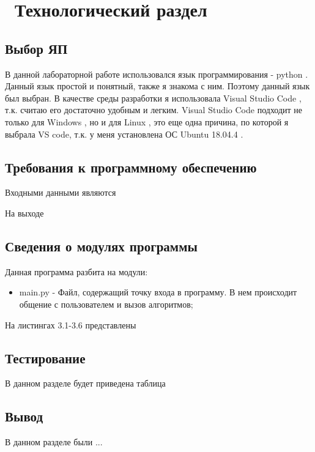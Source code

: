 \chapter{ Технологический раздел}
\label{cha:design}

\section{Выбор ЯП}

В данной лабораторной работе использовался язык программирования - python \cite{bib1}.
Данный язык простой и понятный, также я знакома с ним.
Поэтому данный язык был выбран. 
В качестве среды разработки я использовала Visual Studio Code \cite{bib2}, т.к. считаю его достаточно удобным и легким.
Visual Studio Code подходит не только для  Windows \cite{bib3}, но и для Linux \cite{bib4}, это еще одна причина, по которой я выбрала VS code, т.к. у меня установлена ОС Ubuntu 18.04.4 \cite{bib5}.

\section{Требования к программному обеспечению}

Входными данными являются

На выходе

\section{Сведения о модулях программы}

Данная программа разбита на модули:

\begin{itemize}
	\item main.py - Файл, содержащий точку входа в программу. В нем происходит общение с пользователем и вызов алгоритмов;
\end{itemize}

На листингах 3.1-3.6 представлены 


\section{Тестирование}

В данном разделе будет приведена таблица 

\section{Вывод}

В данном разделе были ...